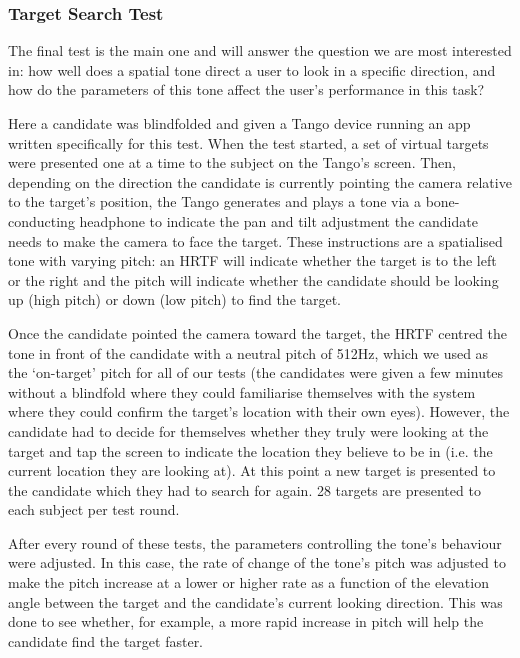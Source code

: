 \documentclass[format=sigconf, review=true, screen=true, anonymous=true]{acmart}
\begin{document}
\subsubsection{Target Search Test}

The final test is the main one and will answer the question we are most interested in: how well does a spatial tone direct a user to look in a specific direction, and how do the parameters of this tone affect the user's performance in this task? 

Here a candidate was blindfolded and given a Tango device running an app written specifically for this test. When the test started, a set of virtual targets were presented one at a time to the subject on the Tango's screen. Then, depending on the direction the candidate is currently pointing the camera relative to the target's position, the Tango generates and plays a tone via a bone-conducting headphone to indicate the pan and tilt adjustment the candidate needs to make the camera to face the target. These instructions are a spatialised tone with varying pitch: an HRTF will indicate whether the target is to the left or the right and the pitch will indicate whether the candidate should be looking up (high pitch) or down (low pitch) to find the target. 

Once the candidate pointed the camera toward the target, the HRTF centred the tone in front of the candidate with a neutral pitch of 512Hz, which we used as the `on-target' pitch for all of our tests (the candidates were given a few minutes without a blindfold where they could familiarise themselves with the system where they could confirm the target's location with their own eyes). However, the candidate had to decide for themselves whether they truly were looking at the target and tap the screen to indicate the location they believe to be in (i.e. the current location they are looking at). At this point a new target is presented to the candidate which they had to search for again. 28 targets are presented to each subject per test round. 

After every round of these tests, the parameters controlling the tone's behaviour were adjusted. In this case, the rate of change of the tone's pitch was adjusted to make the pitch increase at a lower or higher rate as a function of the elevation angle between the target and the candidate's current looking direction. This was done to see whether, for example, a more rapid increase in pitch will help the candidate find the target faster. 
\end{document}
